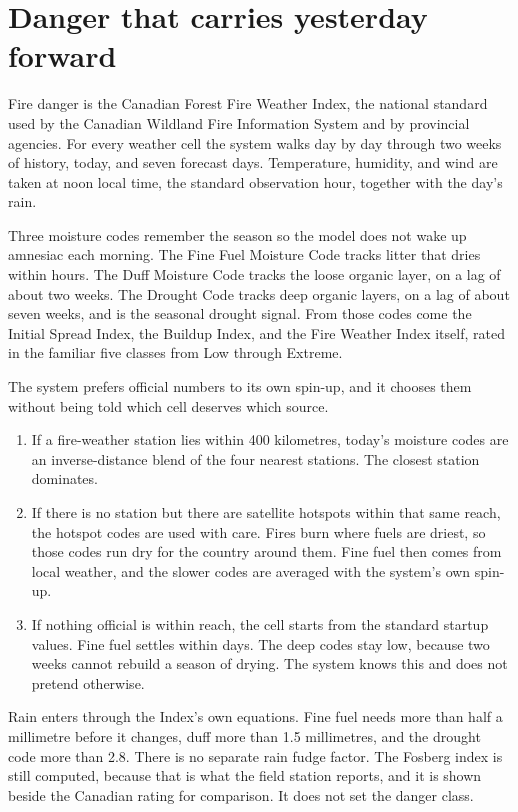 \documentclass[11pt,a4paper]{article}
\begin{document}
\section{Danger that carries yesterday forward}

Fire danger is the Canadian Forest Fire Weather Index, the national standard used by the Canadian Wildland Fire Information System and by provincial agencies. For every weather cell the system walks day by day through two weeks of history, today, and seven forecast days. Temperature, humidity, and wind are taken at noon local time, the standard observation hour, together with the day's rain.

Three moisture codes remember the season so the model does not wake up amnesiac each morning. The Fine Fuel Moisture Code tracks litter that dries within hours. The Duff Moisture Code tracks the loose organic layer, on a lag of about two weeks. The Drought Code tracks deep organic layers, on a lag of about seven weeks, and is the seasonal drought signal. From those codes come the Initial Spread Index, the Buildup Index, and the Fire Weather Index itself, rated in the familiar five classes from Low through Extreme.

The system prefers official numbers to its own spin-up, and it chooses them without being told which cell deserves which source.

\begin{enumerate}
  \item If a fire-weather station lies within 400 kilometres, today's moisture codes are an inverse-distance blend of the four nearest stations. The closest station dominates.
  \item If there is no station but there are satellite hotspots within that same reach, the hotspot codes are used with care. Fires burn where fuels are driest, so those codes run dry for the country around them. Fine fuel then comes from local weather, and the slower codes are averaged with the system's own spin-up.
  \item If nothing official is within reach, the cell starts from the standard startup values. Fine fuel settles within days. The deep codes stay low, because two weeks cannot rebuild a season of drying. The system knows this and does not pretend otherwise.
\end{enumerate}

Rain enters through the Index's own equations. Fine fuel needs more than half a millimetre before it changes, duff more than 1.5 millimetres, and the drought code more than 2.8. There is no separate rain fudge factor. The Fosberg index is still computed, because that is what the field station reports, and it is shown beside the Canadian rating for comparison. It does not set the danger class.
\end{document}
